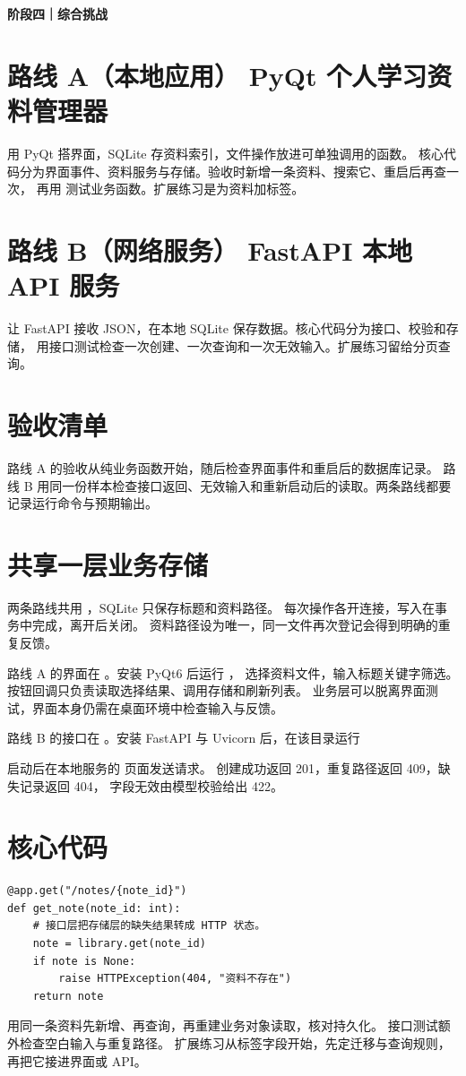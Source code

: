 \textbf{阶段四｜综合挑战}

\section*{路线 A（本地应用） PyQt 个人学习资料管理器}

用 PyQt 搭界面，SQLite 存资料索引，文件操作放进可单独调用的函数。
核心代码分为界面事件、资料服务与存储。验收时新增一条资料、搜索它、重启后再查一次，
再用  测试业务函数。扩展练习是为资料加标签。

\section*{路线 B（网络服务） FastAPI 本地 API 服务}

让 FastAPI 接收 JSON，在本地 SQLite 保存数据。核心代码分为接口、校验和存储，
用接口测试检查一次创建、一次查询和一次无效输入。扩展练习留给分页查询。

\section*{验收清单}
路线 A 的验收从纯业务函数开始，随后检查界面事件和重启后的数据库记录。
路线 B 用同一份样本检查接口返回、无效输入和重新启动后的读取。两条路线都要记录运行命令与预期输出。

\section*{共享一层业务存储}
两条路线共用 ，SQLite 只保存标题和资料路径。
每次操作各开连接，写入在事务中完成，离开后关闭。
资料路径设为唯一，同一文件再次登记会得到明确的重复反馈。

路线 A 的界面在 。安装 PyQt6 后运行 ，
选择资料文件，输入标题关键字筛选。按钮回调只负责读取选择结果、调用存储和刷新列表。
业务层可以脱离界面测试，界面本身仍需在桌面环境中检查输入与反馈。

路线 B 的接口在 。安装 FastAPI 与 Uvicorn 后，在该目录运行
\par\noindent{}\par 
启动后在本地服务的  页面发送请求。
创建成功返回 201，重复路径返回 409，缺失记录返回 404，
字段无效由模型校验给出 422。

\section*{核心代码}
\begin{lstlisting}[title={\code{api.py 中的查询}}]
@app.get("/notes/{note_id}")
def get_note(note_id: int):
    # 接口层把存储层的缺失结果转成 HTTP 状态。
    note = library.get(note_id)
    if note is None:
        raise HTTPException(404, "资料不存在")
    return note
\end{lstlisting}
用同一条资料先新增、再查询，再重建业务对象读取，核对持久化。
接口测试额外检查空白输入与重复路径。
扩展练习从标签字段开始，先定迁移与查询规则，再把它接进界面或 API。
